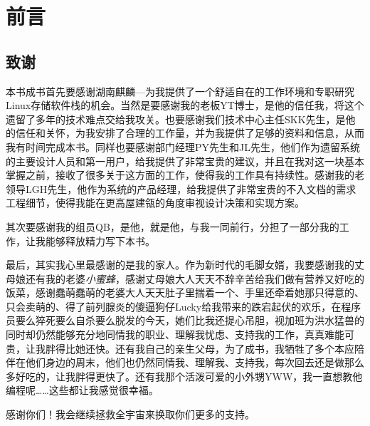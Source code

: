\chapter{前言}

\section*{致谢}
本书成书首先要感谢湖南麒麟---为我提供了一个舒适自在的工作环境和专职研究Linux存储软件栈的机会。当然是要感谢我的老板\textsc{YT}博士，是他的信任我，将这个遗留了多年的技术难点交给我攻关。也要感谢我们技术中心主任\textsc{SKK}先生，是他的信任和关怀，为我安排了合理的工作量，并为我提供了足够的资料和信息，从而我有时间完成本书。同样也要感谢部门经理\textsc{PY}先生和\textsc{JL}先生，他们作为遗留系统的主要设计人员和第一用户，给我提供了非常宝贵的建议，并且在我对这一块基本掌握之前，接收了很多关于这方面的工作，使得我的工作具有持续性。感谢我的老领导\textsc{LGH}先生，他作为系统的产品经理，给我提供了非常宝贵的不入文档的需求工程细节，使得我能在更高屋建瓴的角度审视设计决策和实现方案。

其次要感谢我的组员\textsc{QB}，是他，就是他，与我一同前行，分担了一部分我的工作，让我能够释放精力写下本书。

最后，其实我心里最感谢的是我的家人。作为新时代的毛脚女婿，我要感谢我的丈母娘还有我的老婆\textsl{小蜜蜂}，感谢丈母娘大人天天不辞辛苦给我们做有营养又好吃的饭菜，感谢蠢萌蠢萌的老婆大人天天肚子里揣着一个、手里还牵着她那只得意的、只会卖萌的、得了前列腺炎的傻逼狗仔Lucky给我带来的跌宕起伏的欢乐，在程序员要么猝死要么自杀要么脱发的今天，她们比我还提心吊胆，视加班为洪水猛兽的同时却仍然能够充分地同情我的职业、理解我忧虑、支持我的工作，真真难能可贵，让我胖得比她还快。还有我自己的亲生父母，为了成书，我牺牲了多个本应陪伴在他们身边的周末，他们也仍然同情我、理解我、支持我，每次回去还是做那么多好吃的，让我胖得更快了。还有我那个活泼可爱的小外甥\textsc{YWW}，我一直想教他编程呢……这些都让我感觉很幸福。

感谢你们！我会继续拯救全宇宙来换取你们更多的支持。
